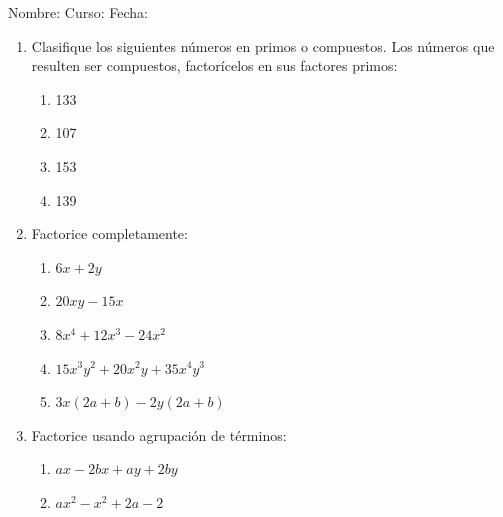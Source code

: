 \documentclass[letterpaper,fleqn]{article}
\newcommand{\LineaNombre}{%
\par
\vspace{\baselineskip}
Nombre:\hrulefill \; Curso: \underline{\hspace*{48pt}} \; Fecha: \underline{\hspace*{2.5cm}} \relax
\par}
\begin{document}
\LineaNombre
\begin{enumerate}
 \item Clasifique los siguientes números en primos o compuestos. Los números que resulten ser compuestos, factorícelos en sus factores primos:
 \begin{enumerate}
 \item 133\noanswer
 \item 107\noanswer
 \item 153\noanswer
 \item 139\noanswer
 \end{enumerate}
 \item Factorice completamente:
 \begin{enumerate}
 \item $6x+2y$\noanswer
 \item $20xy-15x$\noanswer
 \newpage
 \item $8x^{4}+12x^{3}-24x^{2}$\noanswer
 \item $15x^{3}y^{2}+20x^{2}y+35x^{4}y^{3}$\noanswer
 \item $3x(2a+b)-2y(2a+b)$\noanswer
 \end{enumerate}
 \item Factorice usando agrupación de términos:
 \begin{enumerate}
 \item $ax-2bx+ay+2by$\noanswer
 \item $ax^{2}-x^{2}+2a-2$\noanswer
 \end{enumerate}
 \end{enumerate}
\end{document}
